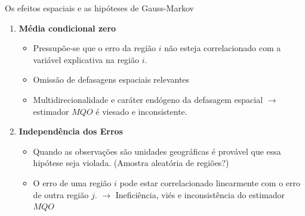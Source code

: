 \documentclass[aspectratio=169]{beamer}
\begin{document}
\begin{frame}{Os efeitos espaciais e as hipóteses de Gauss-Markov}
    \begin{enumerate}
        \item \textbf{Média condicional zero}
            \begin{itemize}
                \item Pressupõe-se que o erro da região $i$ não esteja correlacionado com a variável explicativa na região $i$.
                \item Omissão de defasagens espaciais relevantes 
                \item Multidirecionalidade e caráter endógeno da defasagem espacial $\rightarrow$ estimador $MQO$ é viesado e inconsistente. 
            \end{itemize}
        \item \textbf{Independência dos Erros}
            \begin{itemize}
                \item Quando as observações são unidades geográficas é provável que essa hipótese seja violada. (Amostra aleatória de regiões?)
                \item O erro de uma região $i$ pode estar correlacionado linearmente com o erro de outra região $j$. $\rightarrow$ Ineficiência, viés e inconsistência do estimador $MQO$
            \end{itemize}
    \end{enumerate}
\end{frame}
\end{document}

